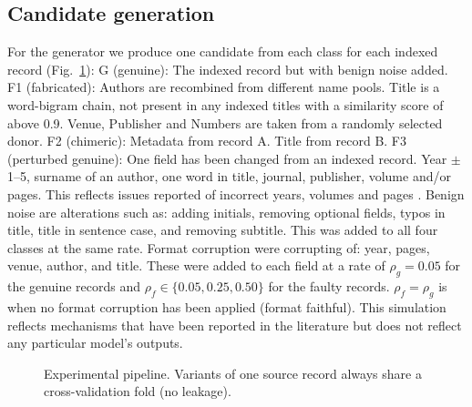 \subsection{Candidate generation}
For the generator we produce one candidate from each class for each indexed record (Fig.~\ref{fig:pipeline}):
G (genuine): The indexed record but with benign noise added.
F1 (fabricated): Authors are recombined from different name pools. Title is a word-bigram chain, not present in any indexed titles with a similarity score of above 0.9. Venue, Publisher and Numbers are taken from a randomly selected donor.
F2 (chimeric): Metadata from record A. Title from record B.
F3 (perturbed genuine): One field has been changed from an indexed record. Year $\pm$1--5, surname of an author, one word in title, journal, publisher, volume and/or pages. This reflects issues reported of incorrect years, volumes and pages \cite{walters2023}.
Benign noise are alterations such as: adding initials, removing optional fields, typos in title, title in sentence case, and removing subtitle. This was added to all four classes at the same rate. Format corruption were corrupting of: year, pages, venue, author, and title. These were added to each field at a rate of $\rho_g{=}0.05$ for the genuine records and $\rho_f\in\{0.05,0.25,0.50\}$ for the faulty records. $\rho_f{=}\rho_g$ is when no format corruption has been applied (format faithful). This simulation reflects mechanisms that have been reported in the literature but does not reflect any particular model's outputs.

\begin{figure}[t]
\centering
{}
\caption{Experimental pipeline. Variants of one source record always share a cross-validation fold (no leakage).}
\label{fig:pipeline}
\end{figure}

